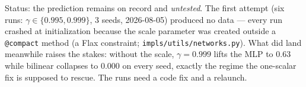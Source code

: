 \documentclass[10pt]{article}
\begin{document}
Status: the prediction remains on record and \emph{untested}. The first attempt (six
runs: $\gamma\in\{0.995, 0.999\}$, 3 seeds, 2026-08-05) produced no data --- every run
crashed at initialization because the scale parameter was created outside a
\texttt{@compact} method (a Flax constraint; \texttt{impls/utils/networks.py}). What did
land meanwhile raises the stakes: without the scale, $\gamma{=}0.999$ lifts the MLP to
$0.63$ while bilinear collapses to $0.000$ on every seed, exactly the regime the
one-scalar fix is supposed to rescue. The runs need a code fix and a relaunch.
\end{document}
